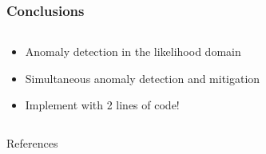 \documentclass[aspectratio=169]{beamer}
\begin{document}
    \begin{frame}
      \frametitle{Conclusions}
      \begin{columns}
      \begin{column}{0.5\textwidth}
        \begin{itemize}
          \item Anomaly detection in the likelihood domain
          \item Simultaneous anomaly detection and mitigation
          \item Implement with 2 lines of code!
        \end{itemize}
    \end{column}
  \end{columns}
\end{frame}

  \begin{frame}[allowframebreaks]{References}
    
  \end{frame}
\end{document}
